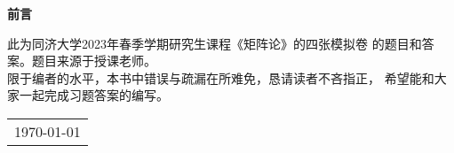 \def\myDateForeword{\today}

\newpage
\thispagestyle{empty}
\begin{center}
    \Huge\textbf{前言}
\end{center}
\indent 此为同济大学2023年春季学期研究生课程《矩阵论》的四张模拟卷
的题目和答案。题目来源于授课老师。\\
限于编者的水平，本书中错误与疏漏在所难免，恳请读者不吝指正，
希望能和大家一起完成习题答案的编写。
\begin{flushright}
    \begin{tabular}{c}
        \myDateForeword
    \end{tabular}
\end{flushright}

\newpage
\pagestyle{plain}
\setcounter{page}{1}
\tableofcontents

\newpage
{}
\setcounter{chapter}{0}
\setcounter{page}{1}

\pagestyle{fancy}
\fancyfoot[C]{\thepage}
\renewcommand{\headrulewidth}{0.4pt}
\renewcommand{\footrulewidth}{0pt}
